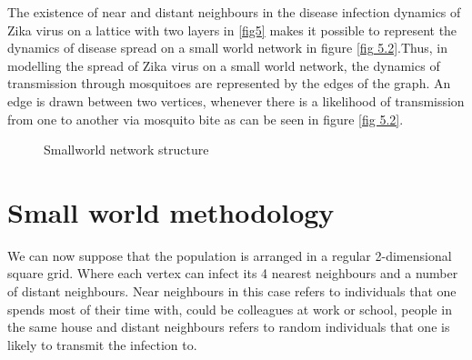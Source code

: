 The existence of near and distant neighbours in the disease infection dynamics of Zika virus on a lattice with two layers in \ref{fig5} makes it possible to represent the dynamics of disease spread on a small world network in figure \ref{fig 5.2}.Thus, in modelling the spread of Zika virus on a small world network, the dynamics of transmission through mosquitoes are represented by the edges of the graph. An edge is drawn between two vertices, whenever there is a likelihood of transmission from one to another via mosquito bite as can be seen in figure \ref{fig 5.2}.
\begin{figure}[h!]
\begin{minipage}[c]{1\textwidth}
 \centering
{}
\end{minipage}
\caption{Smallworld network structure} \label{fig 5.1}
\end{figure}
\section{Small world methodology}

We  can now suppose that the population is arranged in a regular
2-dimensional square grid.  Where each vertex can infect its 4 nearest neighbours and a number of distant neighbours. Near neighbours in this case refers to individuals that one spends most of their time with, could be colleagues at work or school, people in the same house and distant neighbours refers to random individuals that one is likely to transmit the infection to. 
 
